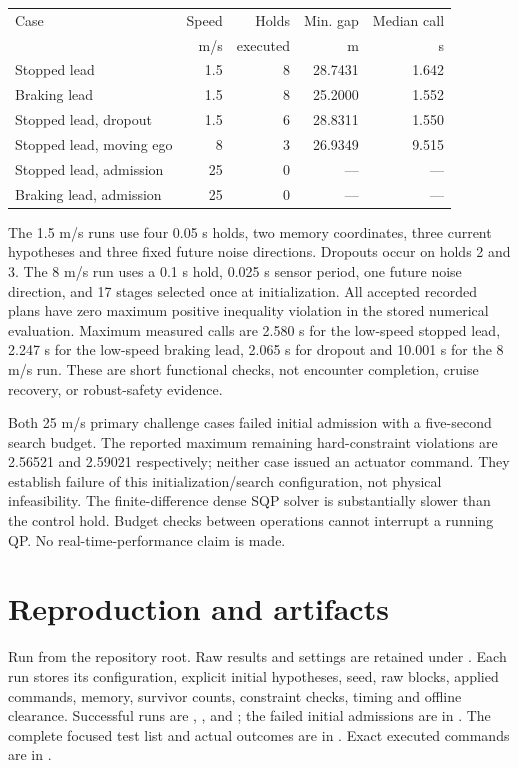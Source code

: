 \documentclass[11pt]{article}
\begin{document}
\begin{center}\small
\begin{tabular}{@{}lrrrr@{}}
\toprule
Case & Speed & Holds & Min. gap & Median call \\
 & m/s & executed & m & s \\
\midrule
Stopped lead & 1.5 & 8 & 28.7431 & 1.642 \\
Braking lead & 1.5 & 8 & 25.2000 & 1.552 \\
Stopped lead, dropout & 1.5 & 6 & 28.8311 & 1.550 \\
Stopped lead, moving ego & 8 & 3 & 26.9349 & 9.515 \\
Stopped lead, admission & 25 & 0 & --- & --- \\
Braking lead, admission & 25 & 0 & --- & --- \\
\bottomrule
\end{tabular}
\end{center}

The 1.5 m/s runs use four 0.05 s holds, two memory coordinates, three current
hypotheses and three fixed future noise directions. Dropouts occur on holds
2 and 3. The 8 m/s run uses a 0.1 s hold, 0.025 s sensor period, one future noise
direction, and 17 stages selected once at initialization. All accepted recorded
plans have zero maximum positive inequality violation in the stored numerical
evaluation. Maximum measured calls are 2.580 s for the low-speed stopped lead,
2.247 s for the low-speed braking lead, 2.065 s for dropout and 10.001 s for the
8 m/s run. These are short functional checks, not encounter completion,
cruise recovery, or robust-safety evidence.

Both 25 m/s primary challenge cases failed initial admission with a five-second
search budget. The reported maximum remaining hard-constraint violations are
2.56521 and 2.59021 respectively; neither case issued an actuator command.
They establish failure of this initialization/search configuration, not physical
infeasibility. The finite-difference dense SQP solver is substantially slower
than the control hold. Budget checks between operations cannot interrupt a
running QP. No real-time-performance claim is made.

\section*{Reproduction and artifacts}
Run from the repository root. Raw results and settings are retained under
. Each run stores its configuration,
explicit initial hypotheses, seed, raw blocks, applied commands, memory, survivor
counts, constraint checks, timing and offline clearance. Successful runs are
, , and ; the failed initial
admissions are in . The complete focused test list
and actual outcomes are in . Exact executed commands are in
.
\end{document}
